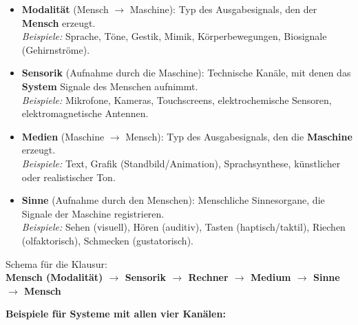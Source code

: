 \documentclass[12pt, a4paper]{article}
\begin{document}
\begin{itemize}
  \item \textbf{Modalität} (Mensch $\rightarrow$ Maschine): Typ des Ausgabesignals,
        den der \textbf{Mensch} erzeugt.\\
        \textit{Beispiele:} Sprache, Töne, Gestik, Mimik, Körperbewegungen,
        Biosignale (Gehirnströme).

  \item \textbf{Sensorik} (Aufnahme durch die Maschine): Technische Kanäle, mit
        denen das \textbf{System} Signale des Menschen aufnimmt.\\
        \textit{Beispiele:} Mikrofone, Kameras, Touchscreens, elektrochemische
        Sensoren, elektromagnetische Antennen.

  \item \textbf{Medien} (Maschine $\rightarrow$ Mensch): Typ des Ausgabesignals,
        den die \textbf{Maschine} erzeugt.\\
        \textit{Beispiele:} Text, Grafik (Standbild/Animation), Sprachsynthese,
        künstlicher oder realistischer Ton.

  \item \textbf{Sinne} (Aufnahme durch den Menschen): Menschliche Sinnesorgane,
        die Signale der Maschine registrieren.\\
        \textit{Beispiele:} Sehen (visuell), Hören (auditiv), Tasten
        (haptisch/taktil), Riechen (olfaktorisch), Schmecken (gustatorisch).
\end{itemize}

\begin{notebox}
  Schema für die Klausur:\\
  \textbf{Mensch (Modalität) $\rightarrow$ Sensorik $\rightarrow$ Rechner
  $\rightarrow$ Medium $\rightarrow$ Sinne $\rightarrow$ Mensch}
\end{notebox}

\textbf{Beispiele für Systeme mit allen vier Kanälen:}
\end{document}
